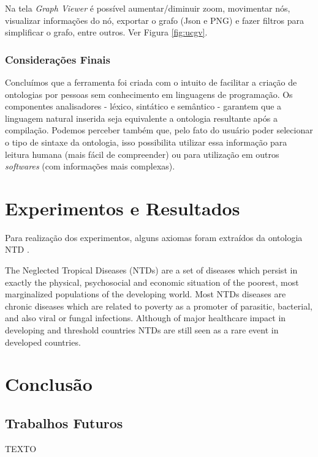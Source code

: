 \documentclass{bcc}
\begin{document}
Na tela \textit{Graph Viewer} é possível aumentar/diminuir zoom, movimentar nós, visualizar informações do nó, exportar o grafo (Json e PNG) e fazer filtros para simplificar o grafo, entre outros. Ver Figura \ref{fig:ucgv}.


\subsection{Considerações Finais}
Concluímos que a ferramenta foi criada com o intuito de facilitar a criação de ontologias por pessoas sem conhecimento em linguagens de programação. Os componentes analisadores - léxico, sintático e semântico - garantem que a linguagem natural inserida seja equivalente a ontologia resultante após a compilação. Podemos perceber também que, pelo fato do usuário poder selecionar o tipo de sintaxe da ontologia, isso possibilita utilizar essa informação para leitura humana (mais fácil de compreender) ou para utilização em outros \textit{softwares} (com informações mais complexas).


\chapter{Experimentos e Resultados}
\label{chap:exp}
Para realização dos experimentos, alguns axiomas foram extraídos da ontologia NTD \cite{ntdo}. %

The Neglected Tropical Diseases (NTDs) are a set of diseases which persist in exactly the physical, psychosocial and economic situation of the poorest, most marginalized populations of the developing world. Most NTDs diseases are chronic diseases which are related to poverty as a promoter of parasitic, bacterial, and also viral or fungal infections. Although of major healthcare impact in developing and threshold countries NTDs are still seen as a rare event in developed countries. 





\chapter{Conclusão}
\label{chap:conclusao}

\section{Trabalhos Futuros}

TEXTO



\end{document}
